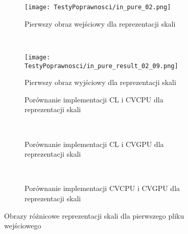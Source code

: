 \begin{figure}[h]

\begin{center}
\begin{subfigure}[t]{0.3\textwidth}
\texttt{[image: TestyPoprawnosci/in\_pure\_02.png]}
\caption{Pierwszy obraz wejściowy dla reprezentacji skali}
\label{fig:valPure02}
\end{subfigure}
~
\begin{subfigure}[t]{0.3\textwidth}
\texttt{[image: TestyPoprawnosci/in\_pure\_result\_02\_09.png]}
\caption{Pierwszy obraz wyjściowy dla reprezentacji skali}
\label{fig:valPureResult02}
\end{subfigure}
\end{center}

\begin{subfigure}[t]{0.3\textwidth}
	\centering
	\setlength\fboxsep{0pt}
	\setlength\fboxrule{0.5pt}
	\caption{Porównanie implementacji CL i CVCPU dla reprezentacji skali}
	\label{fig:valPure2CLCVCPU}
\end{subfigure}
~
\begin{subfigure}[t]{0.3\textwidth}
	\centering
	\setlength\fboxsep{0pt}
	\setlength\fboxrule{0.5pt}
	\caption{Porównanie implementacji CL i CVGPU dla reprezentacji skali}
	\label{fig:valPure2CLCVGPU}
\end{subfigure}
~
\begin{subfigure}[t]{0.3\textwidth}
	\centering
	\setlength\fboxsep{0pt}
	\setlength\fboxrule{0.5pt}
	\caption{Porównanie implementacji CVCPU i CVGPU dla reprezentacji skali}
	\label{fig:valPure2CVCPUCVGPU}                 
\end{subfigure}
\caption{Obrazy różnicowe reprezentacji skali dla pierwszego pliku wejściowego}

\label{fig:valPure2}
\end{figure}

